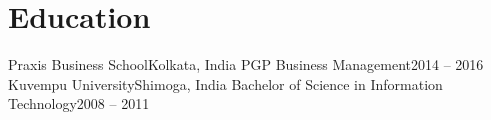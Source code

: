 \section{Education}
  \resumeSubHeadingListStart
    \resumeSubheading
      {Praxis Business School}{Kolkata, India}
      {PGP Business Management}{2014 -- 2016}
    \resumeSubheading
      {Kuvempu University}{Shimoga, India}
      {Bachelor of Science in Information Technology}{2008 -- 2011}
  \resumeSubHeadingListEnd
